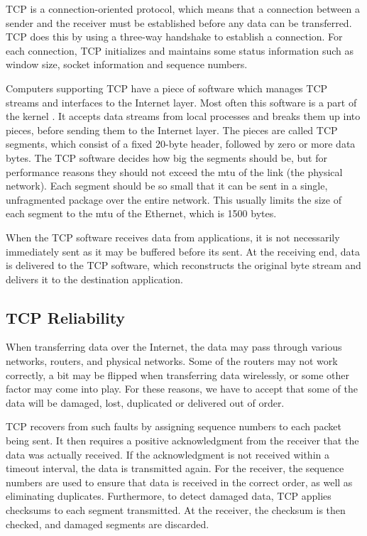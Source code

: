  TCP is a connection-oriented protocol, which means that a connection between a
 sender and the receiver must be established before any data can be transferred.
 TCP does this by using a three-way handshake to establish a connection. For
 each connection, TCP initializes and maintains some status information such as
 window size, socket information and sequence numbers.

Computers supporting TCP have a piece of software which manages TCP streams and
interfaces to the Internet layer. Most often this software is a part of the
kernel \cite{computer-networks}. It accepts data streams from local processes
and breaks them up into pieces, before sending them to the Internet layer. The
pieces are called TCP segments, which consist of a fixed 20-byte header,
followed by zero or more data bytes. The TCP software decides how big the
segments should be, but for performance reasons they should not exceed the
\gls{mtu} of the link (the physical network). Each segment should be so small
that it can be sent in a single, unfragmented package over the entire network.
This usually limits the size of each segment to the \gls{mtu} of the Ethernet,
which is 1500 bytes.

When the TCP software receives data from applications, it is not necessarily
immediately sent as it may be buffered before its sent. At the receiving end,
data is delivered to the TCP software, which reconstructs the original byte
stream and delivers it to the destination application.


\subsection{TCP Reliability}

When transferring data over the Internet, the data may pass through various
networks, routers, and physical networks. Some of the routers may not work
correctly, a bit may be flipped when transferring data wirelessly, or some other
factor may come into play. For these reasons, we have to accept that some of the
data will be damaged, lost, duplicated or delivered out of order.

TCP recovers from such faults by assigning sequence numbers to each packet being
sent. It then requires a positive acknowledgment from the receiver that the
data was actually received. If the acknowledgment is not received within a
timeout interval, the data is transmitted again. For the receiver, the sequence
numbers are used to ensure that data is received in the correct order, as well
as eliminating duplicates. Furthermore, to detect damaged data, TCP applies
checksums to each segment transmitted. At the receiver, the checksum is then
checked, and damaged segments are discarded.

